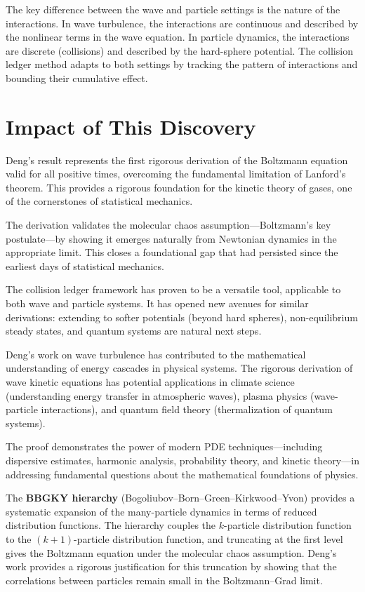 The key difference between the wave and particle settings is the nature of the interactions. In wave turbulence, the interactions are continuous and described by the nonlinear terms in the wave equation. In particle dynamics, the interactions are discrete (collisions) and described by the hard-sphere potential. The collision ledger method adapts to both settings by tracking the pattern of interactions and bounding their cumulative effect.

\section{Impact of This Discovery}

Deng's result represents the first rigorous derivation of the Boltzmann equation valid for all positive times, overcoming the fundamental limitation of Lanford's theorem. This provides a rigorous foundation for the kinetic theory of gases, one of the cornerstones of statistical mechanics.

The derivation validates the molecular chaos assumption---Boltzmann's key postulate---by showing it emerges naturally from Newtonian dynamics in the appropriate limit. This closes a foundational gap that had persisted since the earliest days of statistical mechanics.

The collision ledger framework has proven to be a versatile tool, applicable to both wave and particle systems. It has opened new avenues for similar derivations: extending to softer potentials (beyond hard spheres), non-equilibrium steady states, and quantum systems are natural next steps.

Deng's work on wave turbulence has contributed to the mathematical understanding of energy cascades in physical systems. The rigorous derivation of wave kinetic equations has potential applications in climate science (understanding energy transfer in atmospheric waves), plasma physics (wave-particle interactions), and quantum field theory (thermalization of quantum systems).

The proof demonstrates the power of modern PDE techniques---including dispersive estimates, harmonic analysis, probability theory, and kinetic theory---in addressing fundamental questions about the mathematical foundations of physics.

The \textbf{BBGKY hierarchy} (Bogoliubov--Born--Green--Kirkwood--Yvon) provides a systematic expansion of the many-particle dynamics in terms of reduced distribution functions. The hierarchy couples the $k$-particle distribution function to the $(k+1)$-particle distribution function, and truncating at the first level gives the Boltzmann equation under the molecular chaos assumption. Deng's work provides a rigorous justification for this truncation by showing that the correlations between particles remain small in the Boltzmann--Grad limit.

